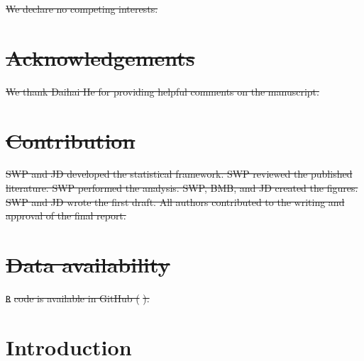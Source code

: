 \documentclass[12pt]{article}
\providecommand{\DIFdeltex}[1]{{\protect\color{red}\sout{#1}}}                      %
\providecommand{\DIFdelend}{} %
\providecommand{\DIFdel}[1]{\texorpdfstring{\DIFdeltex{#1}}{}} %
\DeclareRobustCommand{\DIFdelend}{\DIFOaddend \let\includegraphics\DIFOincludegraphics} %
\begin{document}
\DIFdel{We declare no competing interests.
}%

\section*{\DIFdel{Acknowledgements}}

\DIFdel{We thank Daihai He for providing helpful comments on the manuscript.
}%

\section*{\DIFdel{Contribution}}

\DIFdel{SWP and JD developed the statistical framework. 
SWP reviewed the published literature.
SWP performed the analysis. 
SWP, BMB, and JD created the figures. 
SWP and JD wrote the first draft.
All authors contributed to the writing and approval of the final report.
}%

\section*{\DIFdel{Data availability}}

\texttt{\DIFdel{R}} %
\DIFdel{code is available in GitHub (}%
\DIFdel{).
}%


\DIFdelend \section{Introduction}
\end{document}
